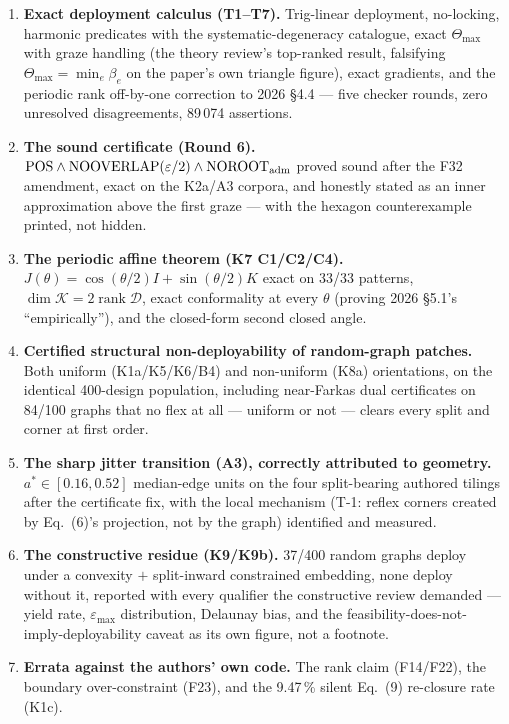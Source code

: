 \documentclass[10pt,a4paper]{article}
\begin{document}
\begin{enumerate}[leftmargin=6mm]
\item \textbf{Exact deployment calculus (T1--T7).} Trig-linear deployment, no-locking, harmonic
predicates with the systematic-degeneracy catalogue, exact $\Theta_{\max}$ with graze handling
(the theory review's top-ranked result, falsifying $\Theta_{\max}=\min_e\beta_e$ on the paper's
own triangle figure), exact gradients, and the periodic rank off-by-one correction to 2026
\S4.4 --- five checker rounds, zero unresolved disagreements, 89\,074 assertions.
\item \textbf{The sound certificate (Round 6).} $\mathrm{POS}\wedge\mathrm{NOOVERLAP}(\varepsilon/2)
\wedge\mathrm{NOROOT}_{\rm adm}$ proved sound after the F32 amendment, exact on the K2a/A3 corpora,
and honestly stated as an inner approximation above the first graze --- with the hexagon
counterexample printed, not hidden.
\item \textbf{The periodic affine theorem (K7 C1/C2/C4).} $J(\theta)=\cos(\theta/2)I+
\sin(\theta/2)K$ exact on 33/33 patterns, $\dim\mathcal K = 2\operatorname{rank}\mathcal D$, exact
conformality at every $\theta$ (proving 2026 \S5.1's ``empirically''), and the closed-form second
closed angle.
\item \textbf{Certified structural non-deployability of random-graph patches.} Both uniform
(K1a/K5/K6/B4) and non-uniform (K8a) orientations, on the identical 400-design population,
including near-Farkas dual certificates on 84/100 graphs that no flex at all --- uniform or not
--- clears every split and corner at first order.
\item \textbf{The sharp jitter transition (A3), correctly attributed to geometry.} $a^*\in
[0.16,0.52]$ median-edge units on the four split-bearing authored tilings after the certificate
fix, with the local mechanism (T-1: reflex corners created by Eq.~(6)'s projection, not by the
graph) identified and measured.
\item \textbf{The constructive residue (K9/K9b).} 37/400 random graphs deploy under a convexity
$+$ split-inward constrained embedding, none deploy without it, reported with every qualifier the
constructive review demanded --- yield rate, $\varepsilon_{\max}$ distribution, Delaunay bias, and
the feasibility-does-not-imply-deployability caveat as its own figure, not a footnote.
\item \textbf{Errata against the authors' own code.} The rank claim (F14/F22), the boundary
over-constraint (F23), and the 9.47\,\% silent Eq.~(9) re-closure rate (K1c).
\end{enumerate}
\end{document}
